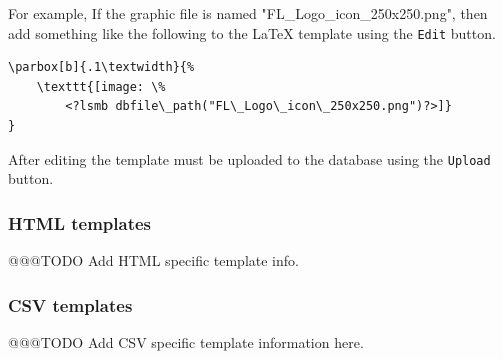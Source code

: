 For example, If the graphic file is named "FL\_Logo\_icon\_250x250.png", then add something like the following to the \LaTeX{} template using the \texttt{Edit} button.

\begin{verbatim}
\parbox[b]{.1\textwidth}{%
    \texttt{[image: \%
        <?lsmb dbfile\_path("FL\_Logo\_icon\_250x250.png")?>]}
}
\end{verbatim}

After editing the template must be uploaded to the database using the \texttt{Upload} button.

\subsubsection{HTML templates}
\label{subsec-company-config-html-templates}

@@@TODO Add HTML specific template info.

\subsubsection{CSV templates}
\label{subsec-company-config-csv-templates}

@@@TODO Add CSV specific template information here.

